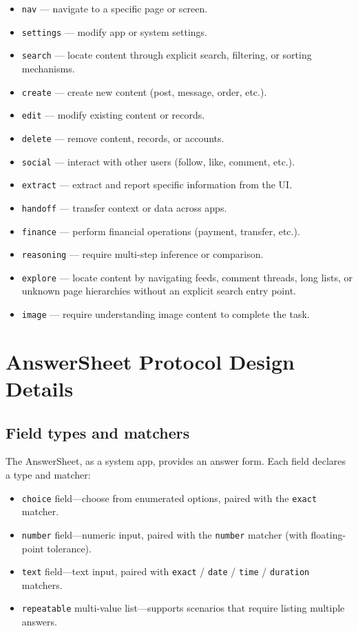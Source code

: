 \begin{itemize}
  \item \texttt{nav} --- navigate to a specific page or screen.
  \item \texttt{settings} --- modify app or system settings.
  \item \texttt{search} --- locate content through explicit search, filtering, or sorting mechanisms.
  \item \texttt{create} --- create new content (post, message, order, etc.).
  \item \texttt{edit} --- modify existing content or records.
  \item \texttt{delete} --- remove content, records, or accounts.
  \item \texttt{social} --- interact with other users (follow, like, comment, etc.).
  \item \texttt{extract} --- extract and report specific information from the UI.
  \item \texttt{handoff} --- transfer context or data across apps.
  \item \texttt{finance} --- perform financial operations (payment, transfer, etc.).
  \item \texttt{reasoning} --- require multi-step inference or comparison.
  \item \texttt{explore} --- locate content by navigating feeds, comment threads, long lists, or unknown page hierarchies without an explicit search entry point.
  \item \texttt{image} --- require understanding image content to complete the task.
\end{itemize}


\section{AnswerSheet Protocol Design Details}\label{app:answersheet}

\subsection{Field types and matchers}

The AnswerSheet, as a system app, provides an answer form. Each field declares a type and matcher:

\begin{itemize}
  \item \texttt{choice} field—choose from enumerated options, paired with the \texttt{exact} matcher.
  \item \texttt{number} field—numeric input, paired with the \texttt{number} matcher (with floating-point tolerance).
  \item \texttt{text} field—text input, paired with \texttt{exact} / \texttt{date} / \texttt{time} / \texttt{duration} matchers.
  \item \texttt{repeatable} multi-value list—supports scenarios that require listing multiple answers.
\end{itemize}

